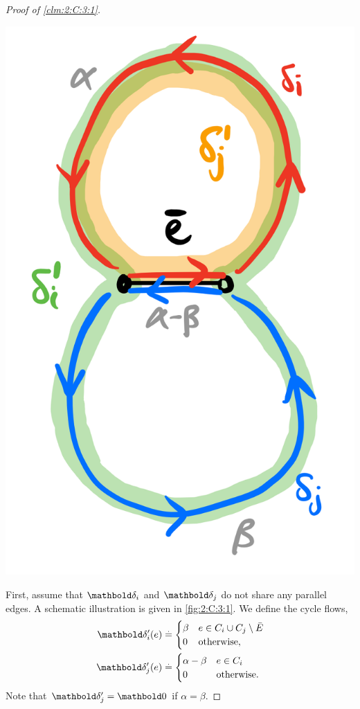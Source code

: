 \documentclass[nobib]{tufte-handout}
\begin{document}
\begin{proof}[Proof of \cref{clm:2:C:3:1}]
\begin{marginfigure}[-3\baselineskip]
\includegraphics[width=\textwidth]{assignments/figures/cycle_decomposition.png}
\caption{Schematic illustration of the cycle flow update. $\vdelta_i$ sends $\alpha$ units of flow and $\vdelta_j$ sends $\beta$ units of flow. The net flow on the edge $\bar{e}$ is $\alpha - \beta$.}\label{fig:2:C:3:1}
\end{marginfigure}

First, assume that $\vdelta_i$ and $\vdelta_j$ do not share any parallel edges. A schematic illustration is given in \cref{fig:2:C:3:1}. We define the cycle flows, \begin{align*}
    \vdelta_i'(e) &\defeq \begin{cases}
        \beta & e \in C_i \cup C_j \setminus \bar{E} \\
        0 & \text{otherwise}, \\
    \end{cases} \\
    \vdelta_j'(e) &\defeq \begin{cases}
        \alpha - \beta & e \in C_i \\
        0 & \text{otherwise}. \\
    \end{cases}
\end{align*} Note that $\vdelta_j' = \vZero$ if $\alpha = \beta$.


\end{proof}
\end{document}
